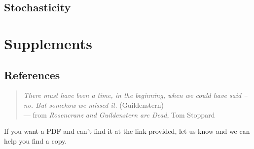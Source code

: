 \documentclass[
]{book}
\begin{document}
\chapter{Stochasticity}\label{stochasticity}

\part{Supplements}\label{part-supplements}

\chapter{References}\label{references}

\begin{quote}
\emph{There must have been a time, in the beginning, when we could have said -- no. But somehow we missed it.} (Guildenstern)\\
--- from \emph{Rosencranz and Guildenstern are Dead}, Tom Stoppard
\end{quote}

If you want a PDF and can't find it at the link provided, let us know and we can help you find a copy.

\printbibliography
\end{document}
